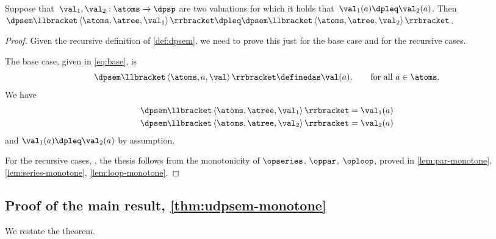 \begin{lemma}
	\label{lem:dpsem-monotone}
	Suppose that~$\val_{1},\val_{2}:\atoms\rightarrow\dpsp$
	are two valuations for which it holds that~$\val_{1}(a)\dpleq\val_{2}(a)$.
	Then~$\dpsem\llbracket\left\langle \atoms,\atree,\val_{1}\right\rangle \rrbracket\dpleq\dpsem\llbracket\left\langle \atoms,\atree,\val_{2}\right\rangle \rrbracket$.
\end{lemma}
\begin{proof}
	Given the recursive definition of \cref{def:dpsem}, we need
	to prove this just for the base case and for the recursive cases.

	The base case, given in \cref{eq:base}, is
	\[
		\dpsem\llbracket\left\langle \atoms,a,\val\right\rangle \rrbracket\definedas\val(a),\qquad\text{for all}\ a\in\atoms.
	\]
	We have
	\begin{align*}
		\dpsem\llbracket\left\langle \atoms,\atree,\val_{1}\right\rangle \rrbracket & =\val_{1}(a) \\
		\dpsem\llbracket\left\langle \atoms,\atree,\val_{2}\right\rangle \rrbracket & =\val_{2}(a)
	\end{align*}
	and $\val_{1}(a)\dpleq\val_{2}(a)$ by assumption.

	For the recursive cases, ,
	the thesis follows from the monotonicity of $\opseries$, $\oppar$,
	$\oploop$, proved in \cref{lem:par-monotone}, \cref{lem:series-monotone},
	\cref{lem:loop-monotone}.
\end{proof}

\subsection{Proof of the main result, \cref{thm:udpsem-monotone}}

\label{subsec:proof-main-result}

We restate the theorem.

